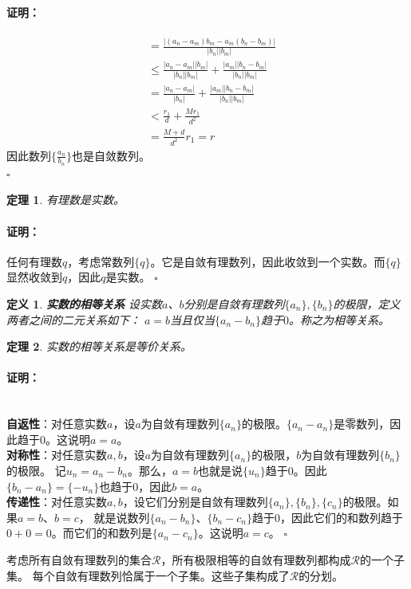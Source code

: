 \documentclass[12pt,UTF8]{ctexbook}
\newtheorem{df}{定义}[section]
\newtheorem{tm}{定理}[section]
\renewenvironment{proof}{\paragraph{\textbf{证明：}}}{\hfill$\square$}
\begin{document}
\begin{appendix}
\begin{proof}
\begin{align*}
        &= \frac{|(a_n - a_m)b_m - a_m(b_n - b_m)|}{|b_n||b_m|}  \\
        &\leqslant \frac{|a_n - a_m||b_m|}{|b_n||b_m|} + \frac{|a_m||b_n - b_m|}{|b_n||b_m|} \\
        &= \frac{|a_n - a_m|}{|b_n|} + \frac{|a_m||b_n - b_m|}{|b_n||b_m|}  \\
        &< \frac{r_1}{d} + \frac{Mr_1}{d^2}  \\
        &= \frac{M+d}{d^2} r_1 = r 
    \end{align*} 
    因此数列$\{\frac{a_n}{b_n}\}$也是自敛数列。\\
\end{proof}

\begin{tm}\label{tm:a-1-5}
    有理数是实数。
\end{tm}
\begin{proof}
    任何有理数$q$，考虑常数列$\{q\}$。它是自敛有理数列，因此收敛到一个实数。而$\{q\}$显然收敛到$q$，因此$q$是实数。
\end{proof}

\begin{df}\textbf{实数的相等关系}
    设实数$a$、$b$分别是自敛有理数列$\{a_n\}, \{b_n\}$的极限，定义两者之间的二元关系如下：
    $a = b$当且仅当$\{a_n - b_n\}$趋于$0$。称之为相等关系。
\end{df}

\begin{tm}\label{tm:a-1-10}
    实数的相等关系是等价关系。
\end{tm}
\begin{proof}
    \mbox{} \\
    \textbf{自返性}：对任意实数$a$，设$a$为自敛有理数列$\{a_n\}$的极限。$\{a_n - a_n\}$是零数列，因此趋于$0$。这说明$a = a$。\\
    \textbf{对称性}：对任意实数$a, b$，设$a$为自敛有理数列$\{a_n\}$的极限，$b$为自敛有理数列$\{b_n\}$的极限。
    记$u_n = a_n - b_n$。那么，$a = b$也就是说$\{u_n\}$趋于$0$。因此$\{b_n - a_n\} = \{-u_n\}$也趋于$0$，因此$b = a$。\\
    \textbf{传递性}：对任意实数$a, b$，设它们分别是自敛有理数列$\{a_n\}, \{b_n\}, \{c_n\}$的极限。如果$a=b$、$b=c$，
    就是说数列$\{a_n - b_n\}$、$\{b_n - c_n\}$趋于$0$，因此它们的和数列趋于$0+0=0$。而它们的和数列是$\{a_n - c_n\}$。这说明$a=c$。
\end{proof}

考虑所有自敛有理数列的集合$\mathcal{R}$，所有极限相等的自敛有理数列都构成$\mathcal{R}$的一个子集。
每个自敛有理数列恰属于一个子集。这些子集构成了$\mathcal{R}$的分划。


\end{appendix}
\end{document}
